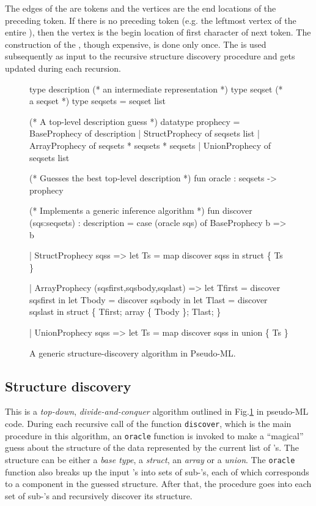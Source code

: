 The edges of the \seqset{} are tokens and the vertices are the end locations
of the preceding token. If there is no preceding token (e.g. the leftmost
vertex of the entire \seqset), then the vertex is the begin location 
of first character of next token.
The construction of the \seqset, though expensive, is done only once.
The \seqset{} is used subsequently as input to the recursive 
structure discovery procedure and gets updated during each recursion.

\begin{figure}[t]
\begin{centercode}
type description (* an intermediate representation *)
type seqset       (* a seqset *)
type seqsets = seqset list

(* A top-level description guess *)
datatype prophecy =
   BaseProphecy   of description
 | StructProphecy of seqsets list 
 | ArrayProphecy  of seqsets * seqsets * seqsets
 | UnionProphecy  of seqsets list

(* Guesses the best top-level description *)
fun oracle : seqsets -> prophecy

(* Implements a generic inference algorithm *)
fun discover (sqs:seqsets) : description =
 case (oracle sqs) of
   BaseProphecy b => b

 | StructProphecy sqss => 
     let Ts = map discover sqss in
     struct \{ Ts \}

 | ArrayProphecy (sqsfirst,sqsbody,sqslast) => 
     let Tfirst = discover sqsfirst in
     let Tbody  = discover sqsbody  in
     let Tlast  = discover sqslast  in
     struct \{ Tfirst; array \{ Tbody \}; Tlast; \}

 | UnionProphecy sqss => 
     let Ts = map discover sqss in
     union \{ Ts \}
\end{centercode}
\caption{A generic structure-discovery algorithm in Pseudo-ML.} 
\label{fig:structure-discovery}
\end{figure}

\subsection{Structure discovery}
This is a {\em top-down}, {\em divide-and-conquer} algorithm outlined in
Fig.\ref{fig:structure-discovery} in pseudo-ML code. 
During each recursive call
of the function {\tt discover}, which is the main procedure in
this algorithm, an {\tt oracle} function is invoked to
make a ``magical'' guess about the structure of the data represented by
the current list of \seqset's. The structure can be 
either a {\em base type}, a {\em struct}, an {\em array} or a {\em union}.
The {\tt oracle} function also breaks up the input \seqset's into
sets of sub-\seqset's, each of which corresponds to a component in
the guessed structure.
After that, the procedure goes into each set of sub-\seqset's and 
recursively discover its structure.

